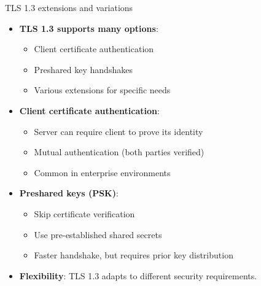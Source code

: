 \ifdefined\PRESENTATION\else\PassOptionsToClass{handout}{beamer}\fi\documentclass[aspectratio=169, lualatex]{beamer}
\begin{document}
\begin{frame}{TLS 1.3 extensions and variations}
	\begin{itemize}
		\item \textbf{TLS 1.3 supports many options}:
		      \begin{itemize}
			      \item Client certificate authentication
			      \item Preshared key handshakes
			      \item Various extensions for specific needs
		      \end{itemize}
		\item \textbf{Client certificate authentication}:
		      \begin{itemize}
			      \item Server can require client to prove its identity
			      \item Mutual authentication (both parties verified)
			      \item Common in enterprise environments
		      \end{itemize}
		\item \textbf{Preshared keys (PSK)}:
		      \begin{itemize}
			      \item Skip certificate verification
			      \item Use pre-established shared secrets
			      \item Faster handshake, but requires prior key distribution
		      \end{itemize}
		\item \textbf{Flexibility}: TLS 1.3 adapts to different security requirements.
	\end{itemize}
\end{frame}
\end{document}
